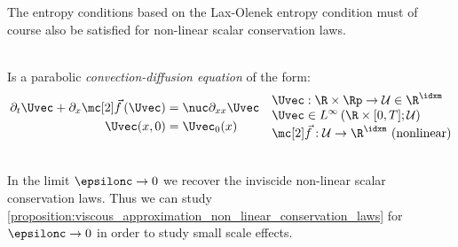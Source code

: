 \begin{sectionbox}\nospacing
    The entropy conditions based on the Lax-Olenek entropy condition must of course also be satisfied for non-linear scalar conservation laws.
\end{sectionbox}
\begin{propositionbox}\nospacing
    \begin{proposition}\label{proposition:viscous_approximation_non_linear_conservation_laws}\leavevmode\\
        Is a parabolic \textit{convection-diffusion equation} of the form:
        \begin{align}
          \begin{aligned}
            \partial_{t}\Uvec+\partial_{x}\fluxvec\left(\Uvec\right)&=\nuc\partial_{xx}\Uvec\\
            \Uvec(x,0)&=\Uvec_{0}(x)
        \end{aligned}&&
        \begin{aligned}
            &\Uvec:\R\times\Rp\to\admissibleset\in\R^{\idxm} \\[-1\jot]
            &\Uvec\in L^{\infty}\left(\R\times[0,T];\admissibleset\right) \\[-1\jot]
            &\fluxvec:\admissibleset\to\R^{\idxm}\text{ (nonlinear)}
        \end{aligned}
        \end{align}
    \end{proposition}
\end{propositionbox}
\begin{defnbox}\nospacing
    \begin{defn}\label{defn:vanishing_viscosity_solution_non_linear_conservation_laws}\leavevmode\\
        In the limit $\epsilonc\to0$ we recover the inviscide non-linear scalar conservation laws.
        Thus we can study \cref{proposition:viscous_approximation_non_linear_conservation_laws} for $\epsilonc\to0$ in order to study small scale effects.
    \end{defn}
\end{defnbox}
